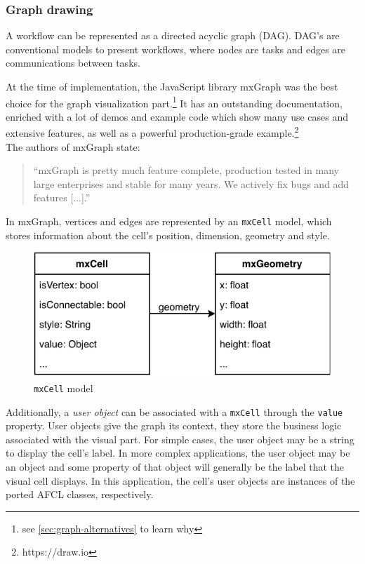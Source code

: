 \documentclass[a4paper,12pt,pdftex,halfparskip,cleardoubleempty,bibtotoc,liststotoc]{scrbook}
\begin{document}
\subsubsection{Graph drawing}

A workflow can be represented as a directed acyclic graph (DAG). DAG's are conventional models to present workflows, where nodes are tasks and edges are communications between tasks.

At the time of implementation, the JavaScript library mxGraph was the best choice for the graph visualization part.\footnote{see \ref{sec:graph-alternatives} to learn why}
It has an outstanding documentation, enriched with a lot of demos and example code which show many use cases and extensive features, as well as a powerful production-grade example.\footnote{https://draw.io}\\
The authors of mxGraph state:\\
\begin{quote}
``mxGraph is pretty much feature complete, production tested in many large enterprises and stable for many years. We actively fix bugs and add features [...].''
\end{quote}

In mxGraph, vertices and edges are represented by an \texttt{mxCell} model, which stores information about the cell's position, dimension, geometry and style.

\begin{figure}[H]
  \centering
  \vspace{0.8cm}
  \includegraphics[]{mxCell}
  \caption{\texttt{mxCell} model}
\end{figure}

Additionally, a \textit{user object} can be associated with a \texttt{mxCell} through the \texttt{value} property. User objects give the graph its context, they store the business logic associated with the visual part. \cite{manuals-mxgraph-user-manual} For simple cases, the user object may be a string to display the cell's label. In more complex applications, the user object may be an object and some property of that object will generally be the label that the visual cell displays. In this application, the cell's user objects are instances of the ported AFCL classes, respectively.
\end{document}
